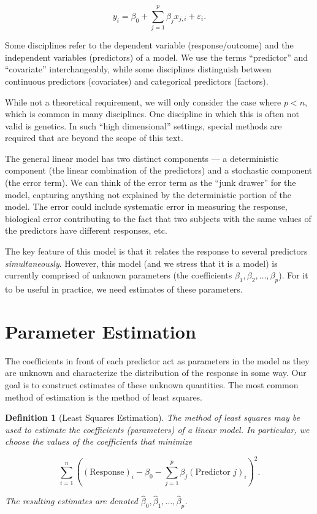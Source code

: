 \documentclass[
]{book}
\theoremstyle{plain}
\theoremstyle{mydefn}
\newtheorem{definition}{Definition}[chapter]
\theoremstyle{myexmpl}
\theoremstyle{remark}
\begin{document}
\[y_i = \beta_0 + \sum\limits_{j=1}^{p} \beta_j x_{j, i} + \varepsilon_i.\]

\begin{rmdtip}
Some disciplines refer to the dependent variable (response/outcome) and the independent variables (predictors) of a model. We use the terms ``predictor'' and ``covariate'' interchangeably, while some disciplines distinguish between continuous predictors (covariates) and categorical predictors (factors).
\end{rmdtip}

\begin{rmdtip}
While not a theoretical requirement, we will only consider the case where \(p < n\), which is common in many disciplines. One discipline in which this is often not valid is genetics. In such ``high dimensional'' settings, special methods are required that are beyond the scope of this text.
\end{rmdtip}

The general linear model has two distinct components --- a deterministic component (the linear combination of the predictors) and a stochastic component (the error term). We can think of the error term as the ``junk drawer'' for the model, capturing anything not explained by the deterministic portion of the model. The error could include systematic error in measuring the response, biological error contributing to the fact that two subjects with the same values of the predictors have different responses, etc.

The key feature of this model is that it relates the response to several predictors \emph{simultaneously}. However, this model (and we stress that it is a model) is currently comprised of unknown parameters (the coefficients \(\beta_1, \beta_2, \dotsc, \beta_p\)). For it to be useful in practice, we need estimates of these parameters.

\hypertarget{parameter-estimation}{%
\section{Parameter Estimation}\label{parameter-estimation}}

The coefficients in front of each predictor act as parameters in the model as they are unknown and characterize the distribution of the response in some way. Our goal is to construct estimates of these unknown quantities. The most common method of estimation is the method of least squares.

\begin{definition}[Least Squares Estimation]
\protect\hypertarget{def:defn-least-squares}{}{\label{def:defn-least-squares} {} }The method of least squares may be used to estimate the coefficients (parameters) of a linear model. In particular, we choose the values of the coefficients that minimize

\[\sum\limits_{i=1}^{n} \left((\text{Response})_i - \beta_0 - \sum\limits_{j=1}^{p} \beta_j (\text{Predictor } j)_{i}\right)^2.\]

The resulting estimates are denoted \(\widehat{\beta}_0, \widehat{\beta}_1, \dotsc, \widehat{\beta}_p\).
\end{definition}
\end{document}
